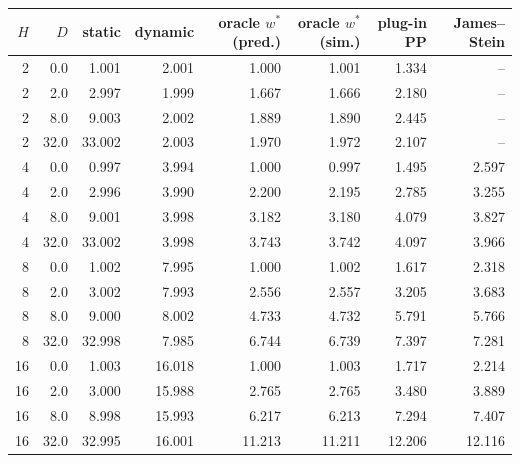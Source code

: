 \begin{tabular}{rrrrrrrr}
\toprule
$H$ & $D$ & static & dynamic & oracle $w^\ast$ (pred.) & oracle $w^\ast$ (sim.) & plug-in PP & James--Stein \\
\midrule
2 & 0.0 & 1.001 & 2.001 & 1.000 & 1.001 & 1.334 & -- \\
2 & 2.0 & 2.997 & 1.999 & 1.667 & 1.666 & 2.180 & -- \\
2 & 8.0 & 9.003 & 2.002 & 1.889 & 1.890 & 2.445 & -- \\
2 & 32.0 & 33.002 & 2.003 & 1.970 & 1.972 & 2.107 & -- \\
4 & 0.0 & 0.997 & 3.994 & 1.000 & 0.997 & 1.495 & 2.597 \\
4 & 2.0 & 2.996 & 3.990 & 2.200 & 2.195 & 2.785 & 3.255 \\
4 & 8.0 & 9.001 & 3.998 & 3.182 & 3.180 & 4.079 & 3.827 \\
4 & 32.0 & 33.002 & 3.998 & 3.743 & 3.742 & 4.097 & 3.966 \\
8 & 0.0 & 1.002 & 7.995 & 1.000 & 1.002 & 1.617 & 2.318 \\
8 & 2.0 & 3.002 & 7.993 & 2.556 & 2.557 & 3.205 & 3.683 \\
8 & 8.0 & 9.000 & 8.002 & 4.733 & 4.732 & 5.791 & 5.766 \\
8 & 32.0 & 32.998 & 7.985 & 6.744 & 6.739 & 7.397 & 7.281 \\
16 & 0.0 & 1.003 & 16.018 & 1.000 & 1.003 & 1.717 & 2.214 \\
16 & 2.0 & 3.000 & 15.988 & 2.765 & 2.765 & 3.480 & 3.889 \\
16 & 8.0 & 8.998 & 15.993 & 6.217 & 6.213 & 7.294 & 7.407 \\
16 & 32.0 & 32.995 & 16.001 & 11.213 & 11.211 & 12.206 & 12.116 \\
\bottomrule
\end{tabular}
